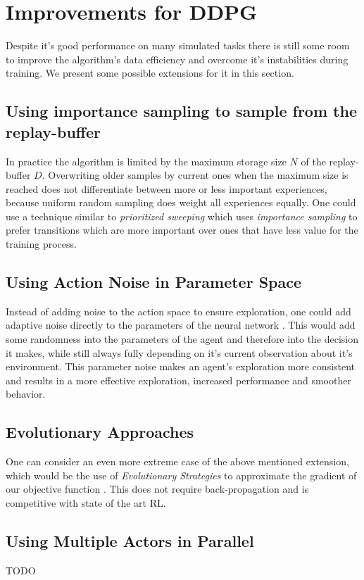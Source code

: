 \section{Improvements for DDPG}
\label{sec:improvements}
Despite it's good performance on many simulated tasks there is still some room to improve the algorithm's data efficiency and overcome it's instabilities during training. We present some possible extensions for it in this section.
\subsection{Using importance sampling to sample from the replay-buffer}
In practice the algorithm is limited by the maximum storage size $\mathit{N}$ of the replay-buffer $\mathit{D}$. Overwriting older samples by current ones when the maximum size is reached does not differentiate between more or less important experiences, because uniform random sampling does weight all experiences equally. One could use a technique similar to \textit{prioritized sweeping} \citep{moore1993prioritized} which uses \textit{importance sampling} \citep{glynn1989importance} to prefer transitions which are more important over ones that have less value for the training process. 
\subsection{Using Action Noise in Parameter Space}
Instead of adding noise to the action space to ensure exploration, one could add adaptive noise directly to the parameters of the neural network \citep{plappert2017parameter}. This would add some randomness into the parameters of the agent and therefore into the decision it makes, while still always fully depending on it's current observation about it's environment. This parameter noise makes an agent's exploration more consistent and results in a more effective exploration, increased performance and smoother behavior. 
\subsection{Evolutionary Approaches}
One can consider an even more extreme case of the above mentioned extension, which would be the use of \textit{Evolutionary Strategies} to approximate the gradient of our objective function \citep{salimans2017evolution}. This does not require back-propagation and is competitive with state of the art RL.

\subsection{Using Multiple Actors in Parallel}
\citep{barth2018distributed}
TODO

